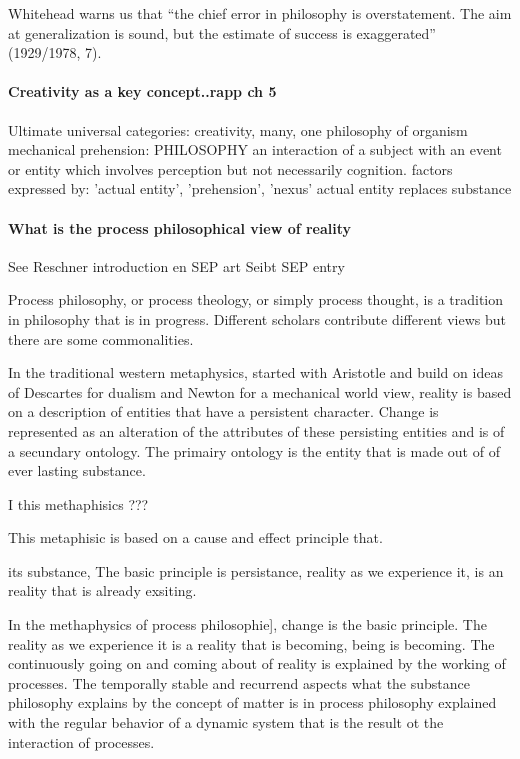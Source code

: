 Whitehead warns us that “the chief error in philosophy is overstatement.
The aim at generalization is sound, but the estimate of success is exaggerated”
(1929/1978, 7).

\paragraph{Creativity as a key concept..rapp ch 5}
\cite[ch 5]{rapp1990whitehead}
Ultimate universal categories: creativity, many, one
philosophy of organism
mechanical 
prehension: PHILOSOPHY
an interaction of a subject with an event or entity which involves perception but not necessarily cognition.
factors expressed by: 'actual entity', 'prehension', 'nexus'
actual entity replaces substance




\paragraph{What is the process philosophical view of reality}
See Reschner introduction en SEP art \cite{Rescher-2012-sep}
Seibt SEP entry \cite{Seibt-2013-sep}


Process philosophy, or process theology, or simply process thought, is a tradition in philosophy that is in progress. Different scholars contribute different views but there are some commonalities.
 
In the traditional western metaphysics, started with Aristotle and build on ideas of Descartes for dualism and Newton for a mechanical world view, reality is based on a description of entities that have a persistent character. Change is represented as an alteration of the attributes of these persisting entities and is of a secundary ontology. The primairy ontology is the entity that is made out of of ever lasting substance.

I this methaphisics ???


This metaphisic is based on a cause and effect principle that.

its substance, The basic principle is persistance, reality as we experience it, is an reality that is already exsiting.

In the methaphysics of process philosophie], change is the basic principle. The reality as we experience it is a reality that is becoming, being is becoming.
The continuously going on and coming about of reality is explained by the working of processes. The temporally stable and recurrend aspects what the substance philosophy explains by the concept of matter is in process philosophy explained with the regular behavior of a dynamic system that is the result ot the interaction of processes.

